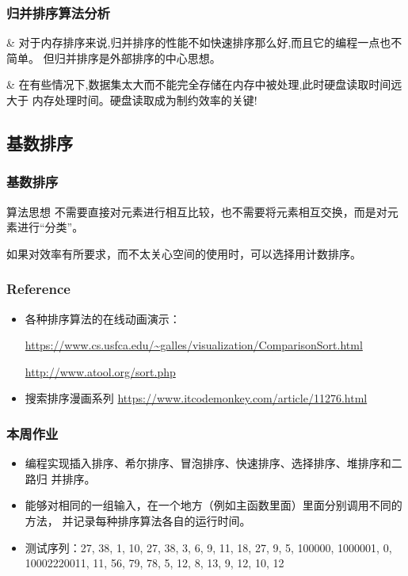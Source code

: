 \begin{frame}[fragile]
  \frametitle{归并排序算法分析}
  \begin{easylist} \easyitem

    & 对于内存排序来说,归并排序的性能不如快速排序那么好,而且它的编程一点也不简单。
    但归并排序是外部排序的中心思想。

    & 在有些情况下,数据集太大而不能完全存储在内存中被处理,此时硬盘读取时间远大于
    内存处理时间。硬盘读取成为制约效率的关键!
  \end{easylist}
\end{frame}

\subsection{基数排序}
\begin{frame}[fragile]
  \frametitle{基数排序}
  \begin{infobox}{算法思想}
    不需要直接对元素进行相互比较，也不需要将元素相互交换，而是对元素进行“分类”。

    如果对效率有所要求，而不太关心空间的使用时，可以选择用计数排序。
  \end{infobox}
\end{frame}

\begin{frame}[fragile]
  \frametitle{Reference}

  \begin{itemize}
  \item 各种排序算法的在线动画演示：

    \url{https://www.cs.usfca.edu/~galles/visualization/ComparisonSort.html}
    
    \url{http://www.atool.org/sort.php}

  \item 搜索排序漫画系列
    \url{https://www.itcodemonkey.com/article/11276.html}
  \end{itemize}
\end{frame}

\begin{frame}[fragile]
  \frametitle{本周作业}
  \begin{itemize}
  \item 编程实现插入排序、希尔排序、冒泡排序、快速排序、选择排序、堆排序和二路归
    并排序。
  \item 能够对相同的一组输入，在一个地方（例如主函数里面）里面分别调用不同的方法，
    并记录每种排序算法各自的运行时间。
  \item 测试序列：27, 38, 1, 10, 27, 38, 3, 6, 9, 11, 18, 27, 9, 5, 100000,
    1000001, 0, 10002220011, 11, 56, 79, 78, 5, 12, 8, 13, 9, 12, 10, 12
  \end{itemize}
\end{frame}